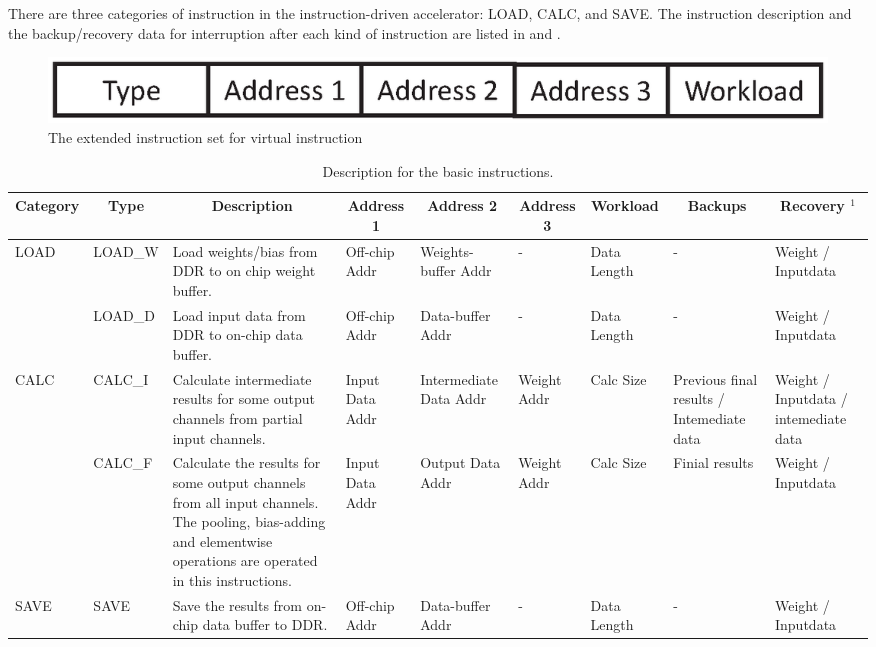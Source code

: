 There are three categories of instruction in the instruction-driven accelerator: LOAD, CALC, and SAVE. The instruction description and the backup/recovery data for interruption after each kind of instruction are listed in  and .

\begin{figure}[h]
	\centering
	\includegraphics[width=0.9\linewidth]{fig/normal_instr.eps}
	\caption{The extended instruction set for virtual instruction }
	\label{fig:normal_instr}
\end{figure}


\begin{table}[t]
	\centering
	\caption{Description for the basic instructions.}
\begin{tabular}{|p{2.7em}|p{3.4em}|p{12.3em}|p{4.2em}|p{4.6em}|p{4.2em}|p{4.2em}||p{4.2em}|p{4.2em}|}
	\hline
	\multicolumn{1}{|c|}{Category} & \multicolumn{1}{c|}{Type} & \multicolumn{1}{c|}{Description} & \multicolumn{1}{c|}{Address 1} & \multicolumn{1}{c|}{Address 2} & \multicolumn{1}{c|}{Address 3} & \multicolumn{1}{c||}{Workload} & \multicolumn{1}{c|}{Backups} & \multicolumn{1}{c|}{Recovery $^1$} \bigstrut\\
	\hline
	\multirow{2}[4]{*}{LOAD} & LOAD\_W & Load weights/bias from DDR to on chip weight buffer. & Off-chip Addr & Weights-buffer Addr & -     & Data  Length & -     & Weight / Inputdata \bigstrut\\
	\cline{2-9}\multicolumn{1}{|c|}{} & LOAD\_D & Load input data from DDR to on-chip data buffer. & Off-chip Addr & Data-buffer Addr & -     & Data  Length & -     & Weight / Inputdata \bigstrut\\
	\hline
	\multirow{2}[4]{*}{CALC} & CALC\_I & Calculate intermediate results for some output channels from partial  input channels. & Input  Data Addr & Intermediate Data Addr & Weight Addr & Calc Size & Previous final results / Intemediate data  & Weight / Inputdata /  intemediate data \bigstrut\\
	\cline{2-9}\multicolumn{1}{|c|}{} & CALC\_F & Calculate the results for some output channels from all input channels. The pooling, bias-adding and elementwise operations are operated in this instructions. & Input  Data Addr & Output  Data Addr & Weight Addr & Calc Size & Finial results & Weight / Inputdata \bigstrut\\
	\hline
	SAVE  & SAVE  & Save the results from on-chip data buffer to DDR. & Off-chip Addr & Data-buffer Addr & -     & Data  Length & -     & Weight / Inputdata \bigstrut\\
	\hline
	\end{tabular}%
	
	\label{tab:instr}%
  \end{table}%


